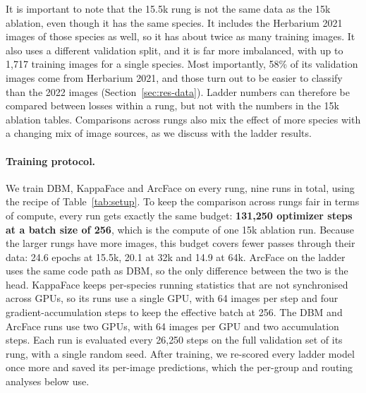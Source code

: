 \documentclass[11pt]{article}
\begin{document}
It is important to note that the 15.5k rung is not the same data as the 15k ablation,
even though it has the same species. It includes the Herbarium 2021 images of those
species as well, so it has about twice as many training images. It also uses a
different validation split, and it is far more imbalanced, with up to 1{,}717 training
images for a single species. Most importantly, 58\% of its validation images come from
Herbarium 2021, and those turn out to be easier to classify than the 2022 images
(Section~\ref{sec:res-data}). Ladder numbers can therefore be compared between losses
within a rung, but not with the numbers in the 15k ablation tables. Comparisons across
rungs also mix the effect of more species with a changing mix of image sources, as we
discuss with the ladder results.

\paragraph{Training protocol.} We train DBM, KappaFace and ArcFace on every rung, nine
runs in total, using the recipe of Table~\ref{tab:setup}. To keep the comparison across rungs fair in
terms of compute, every run gets exactly the same budget: \textbf{131{,}250 optimizer
steps at a batch size of 256}, which is the compute of one 15k ablation run. Because the
larger rungs have more images, this budget covers fewer passes through their data: 24.6
epochs at 15.5k, 20.1 at 32k and 14.9 at 64k. ArcFace on the ladder uses the same code
path as DBM, so the only difference between the two is the head. KappaFace keeps
per-species running statistics that are not synchronised across GPUs, so its runs use a
single GPU, with 64 images per step and four gradient-accumulation steps to keep the
effective batch at 256. The DBM and ArcFace runs use two GPUs, with 64 images per GPU and
two accumulation steps. Each run is evaluated every 26{,}250 steps on the full validation
set of its rung, with a single random seed. After training, we re-scored every ladder
model once more and saved its per-image predictions, which the per-group and routing
analyses below use.
\end{document}
